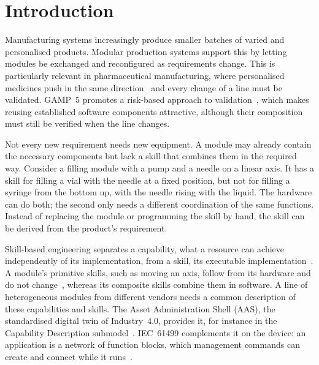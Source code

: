 \documentclass[5p,times,procedia]{elsarticle}
\begin{document}
\section{Introduction}
\label{sec:introduction}

Manufacturing systems increasingly produce smaller batches of varied and personalised products. Modular production systems support this by letting modules be exchanged and reconfigured as requirements change. This is particularly relevant in pharmaceutical manufacturing, where personalised medicines push in the same direction~\cite{schwoerer2025modular} and every change of a line must be validated. GAMP~5 promotes a risk-based approach to validation~\cite{ispe2022gamp5}, which makes reusing established software components attractive, although their composition must still be verified when the line changes.

Not every new requirement needs new equipment. A module may already contain the necessary components but lack a skill that combines them in the required way. Consider a filling module with a pump and a needle on a linear axis. It has a skill for filling a vial with the needle at a fixed position, but not for filling a syringe from the bottom up, with the needle rising with the liquid. The hardware can do both; the second only needs a different coordination of the same functions. Instead of replacing the module or programming the skill by hand, the skill can be derived from the product's requirement.

Skill-based engineering separates a capability, what a resource can achieve independently of its implementation, from a skill, its executable implementation~\cite{koecher2023reference}. A module's primitive skills, such as moving an axis, follow from its hardware and do not change~\cite{schou2018skill}, whereas its composite skills combine them in software. A line of heterogeneous modules from different vendors needs a common description of these capabilities and skills. The Asset Administration Shell (AAS), the standardised digital twin of Industry~4.0, provides it, for instance in the Capability Description submodel~\cite{idta02020}. IEC~61499 complements it on the device: an application is a network of function blocks, which management commands can create and connect while it runs~\cite{iec61499}.
\end{document}
